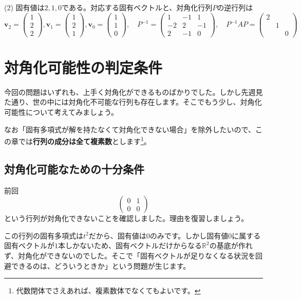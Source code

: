\noindent (2) 固有値は$2, 1, 0$である。対応する固有ベクトルと、対角化行列$P$の逆行列は
\[
\bm{v}_{2} = 
\begin{pmatrix}
1 \\
2 \\
2
\end{pmatrix}, 
\bm{v}_{1} = 
\begin{pmatrix}
1 \\
2 \\
1
\end{pmatrix}, 
\bm{v}_{0} = 
\begin{pmatrix}
1 \\
1 \\
0
\end{pmatrix}, \quad
P^{-1} = 
\begin{pmatrix}
1 & -1 & 1 \\
-2 & 2 & -1 \\
2 & -1 & 0
\end{pmatrix}, \quad
P^{-1} AP =
\begin{pmatrix}
2 \\
 & 1 \\
 & & 0
\end{pmatrix}
\]

\section{対角化可能性の判定条件}

今回の問題はいずれも、上手く対角化ができるものばかりでした。しかし先週見た通り、世の中には対角化不可能な行列も存在します。そこでもう少し、対角化可能性について考えてみましょう。

なお「固有多項式が解を持たなくて対角化できない場合」を除外したいので、この章では\textbf{行列の成分は全て複素数}とします\footnote{代数閉体でさえあれば、複素数体でなくてもよいです。}。

\subsection{対角化可能なための十分条件}

前回
\[
\begin{pmatrix}
0 & 1 \\
0 & 0
\end{pmatrix}
\]
という行列が対角化できないことを確認しました。理由を復習しましょう。

この行列の固有多項式は$t^2$だから、固有値は$0$のみです。しかし固有値$0$に属する固有ベクトルが$1$本しかないため、固有ベクトルだけからなる$\mathbb{R}^2$の基底が作れず、対角化ができないのでした。そこで「固有ベクトルが足りなくなる状況を回避できるのは、どういうときか」という問題が生じます。

